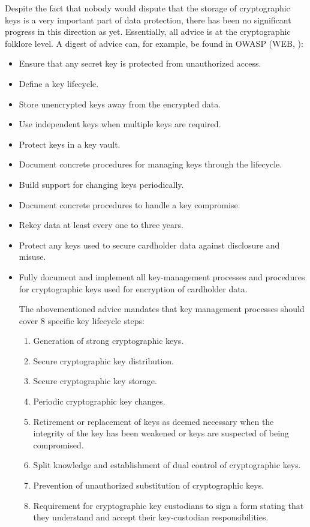 \documentclass{bjmc}
\begin{document}
Despite the fact that  nobody would dispute that the storage of cryptographic keys is a very important part of data protection, there has been no significant progress in this direction as yet.
Essentially, all advice is at the cryptographic folklore level.  A digest of advice can, for example, be found in OWASP  (WEB,  \cite{Sh}):
\begin{itemize}
\item { Ensure that any secret key is protected from unauthorized access.}
\item { Define a key lifecycle.}
\item { Store unencrypted keys away from the encrypted data.}
\item {Use independent keys when multiple keys are required.}
\item {Protect keys in a key vault.}
\item {Document concrete procedures for managing keys through the lifecycle.}
\item {Build support for changing keys periodically.}
\item {Document concrete procedures to handle a key compromise.}
\item {Rekey data at least every one to three years.}
\item {Protect any keys used to secure cardholder data against disclosure and misuse.}
\item Fully document and implement all key-management processes and procedures for
cryptographic keys used for encryption of cardholder data.

The abovementioned advice mandates that key management processes should cover  8 specific key lifecycle steps:

\begin{enumerate}
\item  Generation of strong cryptographic keys.
\item  Secure cryptographic key distribution.
\item  Secure cryptographic key storage.
\item  Periodic cryptographic key changes.
\item  Retirement or replacement of keys as deemed necessary when the integrity of the
key has been weakened or keys are suspected of being compromised.
\item  Split knowledge and establishment of dual control of cryptographic keys.
\item  Prevention of unauthorized substitution of cryptographic keys.
\item  Requirement for cryptographic key custodians to sign a form stating that they
understand and accept their key-custodian responsibilities.
\end{enumerate}
\end{itemize} 
\end{document}
